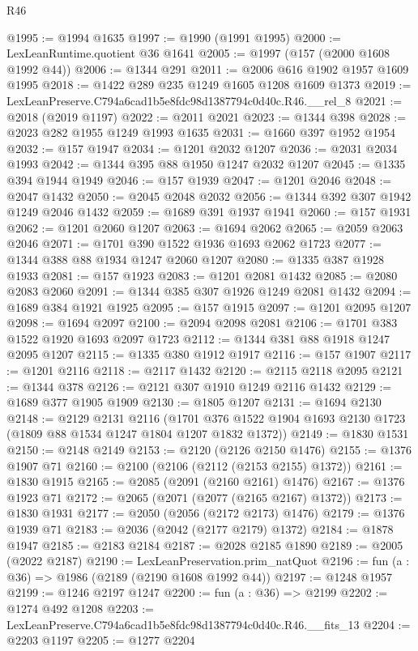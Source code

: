 \begin{lexlean}{R46}
\begin{coremodule}
@1995 := @1994 @1635
@1997 := @1990 (@1991 @1995)
@2000 := LexLeanRuntime.quotient @36 @1641
@2005 := @1997 (@157 (@2000 @1608 @1992 @44))
@2006 := @1344 @291
@2011 := @2006 @616 @1902 @1957 @1609 @1995
@2018 := @1422 @289 @235 @1249 @1605 @1208 @1609 @1373
@2019 := LexLeanPreserve.C794a6cad1b5e8fdc98d1387794c0d40c.R46.__rel_8
@2021 := @2018 (@2019 @1197)
@2022 := @2011 @2021
@2023 := @1344 @398
@2028 := @2023 @282 @1955 @1249 @1993 @1635
@2031 := @1660 @397 @1952 @1954
@2032 := @157 @1947
@2034 := @1201 @2032 @1207
@2036 := @2031 @2034 @1993
@2042 := @1344 @395 @88 @1950 @1247 @2032 @1207
@2045 := @1335 @394 @1944 @1949
@2046 := @157 @1939
@2047 := @1201 @2046
@2048 := @2047 @1432
@2050 := @2045 @2048 @2032
@2056 := @1344 @392 @307 @1942 @1249 @2046 @1432
@2059 := @1689 @391 @1937 @1941
@2060 := @157 @1931
@2062 := @1201 @2060 @1207
@2063 := @1694 @2062
@2065 := @2059 @2063 @2046
@2071 := @1701 @390 @1522 @1936 @1693 @2062 @1723
@2077 := @1344 @388 @88 @1934 @1247 @2060 @1207
@2080 := @1335 @387 @1928 @1933
@2081 := @157 @1923
@2083 := @1201 @2081 @1432
@2085 := @2080 @2083 @2060
@2091 := @1344 @385 @307 @1926 @1249 @2081 @1432
@2094 := @1689 @384 @1921 @1925
@2095 := @157 @1915
@2097 := @1201 @2095 @1207
@2098 := @1694 @2097
@2100 := @2094 @2098 @2081
@2106 := @1701 @383 @1522 @1920 @1693 @2097 @1723
@2112 := @1344 @381 @88 @1918 @1247 @2095 @1207
@2115 := @1335 @380 @1912 @1917
@2116 := @157 @1907
@2117 := @1201 @2116
@2118 := @2117 @1432
@2120 := @2115 @2118 @2095
@2121 := @1344 @378
@2126 := @2121 @307 @1910 @1249 @2116 @1432
@2129 := @1689 @377 @1905 @1909
@2130 := @1805 @1207
@2131 := @1694 @2130
@2148 := @2129
    @2131
    @2116
    (@1701 @376 @1522 @1904 @1693 @2130 @1723 (@1809 @88 @1534 @1247 @1804 @1207 @1832 @1372))
@2149 := @1830 @1531
@2150 := @2148 @2149
@2153 := @2120 (@2126 @2150 @1476)
@2155 := @1376 @1907 @71
@2160 := @2100 (@2106 (@2112 (@2153 @2155) @1372))
@2161 := @1830 @1915
@2165 := @2085 (@2091 (@2160 @2161) @1476)
@2167 := @1376 @1923 @71
@2172 := @2065 (@2071 (@2077 (@2165 @2167) @1372))
@2173 := @1830 @1931
@2177 := @2050 (@2056 (@2172 @2173) @1476)
@2179 := @1376 @1939 @71
@2183 := @2036 (@2042 (@2177 @2179) @1372)
@2184 := @1878 @1947
@2185 := @2183 @2184
@2187 := @2028 @2185 @1890
@2189 := @2005 (@2022 @2187)
@2190 := LexLeanPreservation.prim_natQuot
@2196 := fun (a : @36) => @1986 (@2189 (@2190 @1608 @1992 @44))
@2197 := @1248 @1957
@2199 := @1246 @2197 @1247
@2200 := fun (a : @36) => @2199
@2202 := @1274 @492 @1208
@2203 := LexLeanPreserve.C794a6cad1b5e8fdc98d1387794c0d40c.R46.__fits_13
@2204 := @2203 @1197
@2205 := @1277 @2204

\end{coremodule}
\end{lexlean}

